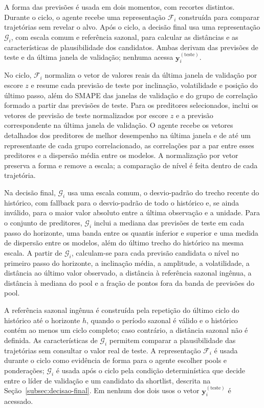 A forma das previsões é usada em dois momentos, com recortes distintos. Durante o ciclo, o agente recebe uma representação $\mathcal{F}_i$ construída para comparar trajetórias sem revelar o alvo. Após o ciclo, a decisão final usa uma representação $\mathcal{G}_i$, com escala comum e referência sazonal, para calcular as distâncias e as características de plausibilidade dos candidatos. Ambas derivam das previsões de teste e da última janela de validação; nenhuma acessa $\mathbf{y}_i^{(\mathrm{teste})}$.

No ciclo, $\mathcal{F}_i$ normaliza o vetor de valores reais da última janela de validação por escore $z$ e resume cada previsão de teste por inclinação, volatilidade e posição do último passo, além do SMAPE das janelas de validação e do grupo de correlação formado a partir das previsões de teste. Para os preditores selecionados, inclui os vetores de previsão de teste normalizados por escore $z$ e a previsão correspondente na última janela de validação. O agente recebe os vetores detalhados dos preditores de melhor desempenho na última janela e de até um representante de cada grupo correlacionado, as correlações par a par entre esses preditores e a dispersão média entre os modelos. A normalização por vetor preserva a forma e remove a escala; a comparação de nível é feita dentro de cada trajetória.

Na decisão final, $\mathcal{G}_i$ usa uma escala comum, o desvio-padrão do trecho recente do histórico, com fallback para o desvio-padrão de todo o histórico e, se ainda inválido, para o maior valor absoluto entre a última observação e a unidade. Para o conjunto de preditores, $\mathcal{G}_i$ inclui a mediana das previsões de teste em cada passo do horizonte, uma banda entre os quantis inferior e superior e uma medida de dispersão entre os modelos, além do último trecho do histórico na mesma escala. A partir de $\mathcal{G}_i$, calculam-se para cada previsão candidata o nível no primeiro passo do horizonte, a inclinação média, a amplitude, a volatilidade, a distância ao último valor observado, a distância à referência sazonal ingênua, a distância à mediana do pool e a fração de pontos fora da banda de previsões do pool.

A referência sazonal ingênua é construída pela repetição do último ciclo do histórico até o horizonte $h$, quando o período sazonal é válido e o histórico contém ao menos um ciclo completo; caso contrário, a distância sazonal não é definida. As características de $\mathcal{G}_i$ permitem comparar a plausibilidade das trajetórias sem consultar o valor real de teste. A representação $\mathcal{F}_i$ é usada durante o ciclo como evidência de forma para o agente escolher pools e ponderações; $\mathcal{G}_i$ é usada após o ciclo pela condição determinística que decide entre o líder de validação e um candidato da shortlist, descrita na Seção~\ref{subsec:decisao-final}. Em nenhum dos dois usos o vetor $\mathbf{y}_i^{(\mathrm{teste})}$ é acessado.


